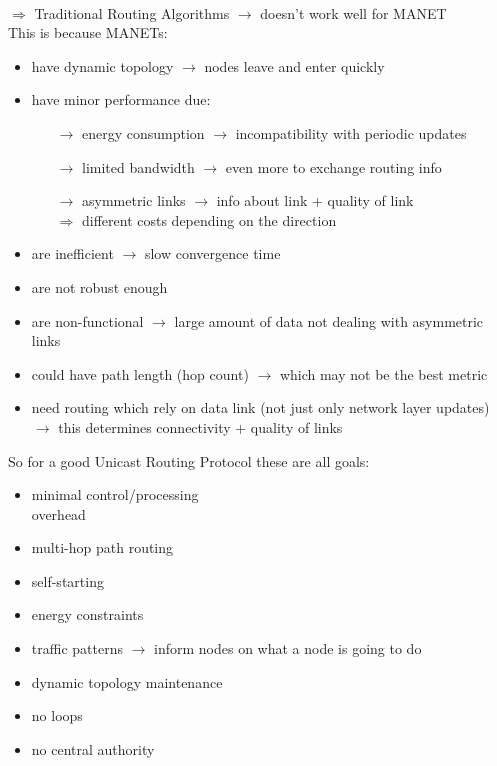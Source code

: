 \\[0.3cm]
$\Rightarrow$ Traditional Routing Algorithms $\rightarrow$ doesn't work well for MANET\\
This is because MANETs:
\begin{itemize}
    \item have dynamic topology $\rightarrow$ nodes leave and enter quickly
    \item have minor performance due:
    \begin{itemize}
        \item[$\rightarrow$] energy consumption $\rightarrow$ incompatibility with periodic updates
        \item[$\rightarrow$] limited bandwidth $\rightarrow$ even more to exchange routing info
        \item[$\rightarrow$] asymmetric links $\rightarrow$ info about link + quality of link\\
        $\Rightarrow$ different costs depending on the direction
    \end{itemize}
    \item are inefficient $\rightarrow$ slow convergence time
    \item are not robust enough
    \item are non-functional $\rightarrow$ large amount of data not dealing with asymmetric links
    \item could have path length (hop count) $\rightarrow$ which may not be the best metric
    \item need routing which rely on data link (not just only network layer updates)\\
    $\rightarrow$ this determines connectivity + quality of links
\end{itemize}
So for a good Unicast Routing Protocol these are all goals:\\[0.3cm]
\begin{minipage}{.5\linewidth}
    \begin{itemize}
        \item minimal control/processing\\overhead
        \item multi-hop path routing
        \item self-starting
        \item energy constraints
        \end{itemize}
\end{minipage}
\begin{minipage}{.5\linewidth}
    \begin{itemize}
        \item traffic patterns $\rightarrow$ inform nodes on what a node is going to do
        \item dynamic topology maintenance
        \item no loops
        \item no central authority
        \end{itemize}
\end{minipage}

